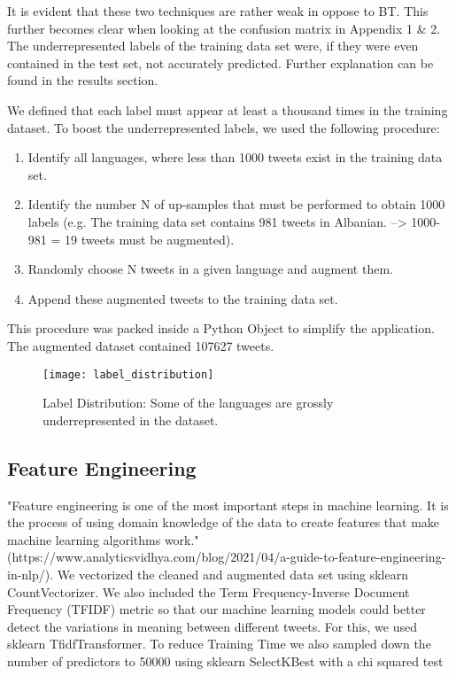 \documentclass[fleqn,10pt]{SelfArx} %
\begin{document}
It is evident that these two techniques are rather weak in oppose to BT. This further becomes clear when looking at the confusion matrix in Appendix 1 \& 2. The underrepresented labels of the training data set were, if they were even contained in the test set, not accurately predicted. Further explanation can be found in the results section. \newline

We defined that each label must appear at least a thousand times in the training dataset. To boost the underrepresented labels, we used the following procedure:
\begin{enumerate}[noitemsep]
	\item Identify all languages, where less than 1000 tweets exist in the training data set.
	\item Identify the number N of up-samples that must be performed to obtain 1000 labels (e.g. The training data set contains 981 tweets in Albanian. --> 1000-981 = 19 tweets must be augmented).
	\item Randomly choose N tweets in a given language and augment them.
	\item Append these augmented tweets to the training data set.
\end{enumerate}
This procedure was packed inside a Python Object to simplify the application. The augmented dataset contained 107627 tweets. 


\begin{figure}[ht]\centering
	\texttt{[image: label\_distribution]}
	\caption{Label Distribution: Some of the languages are grossly underrepresented in the dataset.}
	\label{fig:results}
\end{figure}

\subsection{Feature Engineering}

"Feature engineering is one of the most important steps in machine learning. It is the process of using domain knowledge of the data to create features that make machine learning algorithms work." (https://www.analyticsvidhya.com/blog/2021/04/\newline a-guide-to-feature-engineering-in-nlp/). We vectorized the cleaned and augmented data set using sklearn CountVectorizer. We also included the Term Frequency-Inverse Document Frequency (TFIDF) metric so that our machine learning models could better detect the variations in meaning between different tweets. For this, we used sklearn TfidfTransformer. To reduce Training Time we also sampled down the number of predictors to 50000 using sklearn SelectKBest with a chi squared test
\end{document}
